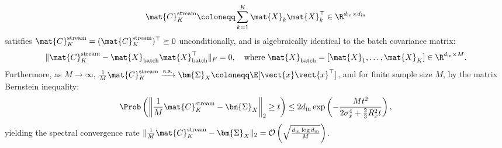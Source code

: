 \begin{theorem}
\begin{enumerate}
    \begin{equation}
    \mat{C}_K^{\text{stream}} \coloneqq \sum_{k=1}^K \mat{X}_k \mat{X}_k^\top \in \R^{d_{\text{in}} \times d_{\text{in}}}
    \label{eq:streaming_accumulator_def}
    \end{equation}
    satisfies $\mat{C}_K^{\text{stream}} = (\mat{C}_K^{\text{stream}})^\top \succeq 0$ unconditionally, and is algebraically identical to the batch covariance matrix:
    \begin{equation}
    \|\mat{C}_K^{\text{stream}} - \mat{X}_{\text{batch}} \mat{X}_{\text{batch}}^\top\|_F = 0, \quad \text{where } \mat{X}_{\text{batch}} = [\mat{X}_1, \dots, \mat{X}_K] \in \R^{d_{\text{in}} \times M}.
    \label{eq:streaming_exact_zero}
    \end{equation}
    Furthermore, as $M \to \infty$, $\frac{1}{M} \mat{C}_K^{\text{stream}} \xrightarrow{\text{a.s.}} \bm{\Sigma}_X \coloneqq \E[\vect{x}\vect{x}^\top]$, and for finite sample size $M$, by the matrix Bernstein inequality:
    \begin{equation}
    \Prob\left( \left\| \frac{1}{M} \mat{C}_K^{\text{stream}} - \bm{\Sigma}_X \right\|_2 \ge t \right) \le 2 d_{\text{in}} \exp\left( -\frac{M t^2}{2 \sigma_x^4 + \frac{2}{3} R_x^2 t} \right),
    \label{eq:bernstein_cov_bound}
    \end{equation}
    yielding the spectral convergence rate $\|\frac{1}{M} \mat{C}_K^{\text{stream}} - \bm{\Sigma}_X\|_2 = \mathcal{O}\left(\sqrt{\frac{d_{\text{in}} \log d_{\text{in}}}{M}}\right)$.
\end{enumerate}
\end{theorem}

